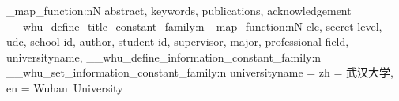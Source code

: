 \clist_map_function:nN
  {
    abstract,
    keywords,
    publications,
    acknowledgement
  }
  \__whu_define_title_constant_family:n
\clist_map_function:nN
  {
    clc,  %
    secret-level,  %
    udc,  %
    school-id,  %
    author,  %
    student-id,  %
    supervisor,  %
    major,  %
    professional-field,  %
    universityname,  %
  }
  \__whu_define_information_constant_family:n
\__whu_set_information_constant_family:n
  {
    universityname = 
      {
        zh = 武汉大学,
        en = Wuhan~University
      }
  }